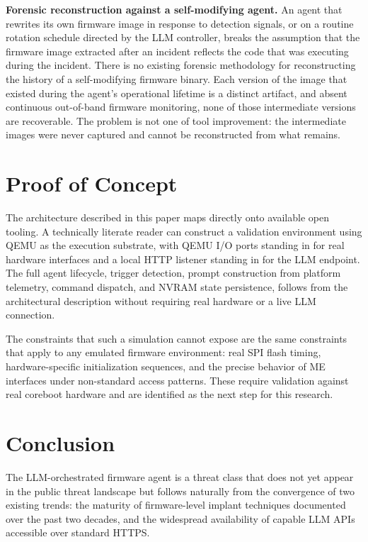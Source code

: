 \documentclass[11pt,a4paper]{article}
\begin{document}
\textbf{Forensic reconstruction against a self-modifying agent.} An agent that rewrites its own firmware image in response to detection signals, or on a routine rotation schedule directed by the LLM controller, breaks the assumption that the firmware image extracted after an incident reflects the code that was executing during the incident. There is no existing forensic methodology for reconstructing the history of a self-modifying firmware binary. Each version of the image that existed during the agent's operational lifetime is a distinct artifact, and absent continuous out-of-band firmware monitoring, none of those intermediate versions are recoverable. The problem is not one of tool improvement: the intermediate images were never captured and cannot be reconstructed from what remains.

\section{Proof of Concept}

The architecture described in this paper maps directly onto available open tooling. A technically literate reader can construct a validation environment using QEMU as the execution substrate, with QEMU I/O ports standing in for real hardware interfaces and a local HTTP listener standing in for the LLM endpoint. The full agent lifecycle, trigger detection, prompt construction from platform telemetry, command dispatch, and NVRAM state persistence, follows from the architectural description without requiring real hardware or a live LLM connection.

The constraints that such a simulation cannot expose are the same constraints that apply to any emulated firmware environment: real SPI flash timing, hardware-specific initialization sequences, and the precise behavior of ME interfaces under non-standard access patterns. These require validation against real coreboot hardware and are identified as the next step for this research.

\section{Conclusion}

The LLM-orchestrated firmware agent is a threat class that does not yet appear in the public threat landscape but follows naturally from the convergence of two existing trends: the maturity of firmware-level implant techniques documented over the past two decades, and the widespread availability of capable LLM APIs accessible over standard HTTPS.
\end{document}

